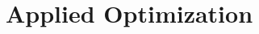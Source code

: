 \section{Applied Optimization} \label{S:3.4.AppliedOpt}



\newpage



\newpage



\newpage



\newpage



\newpage

\clearpage
